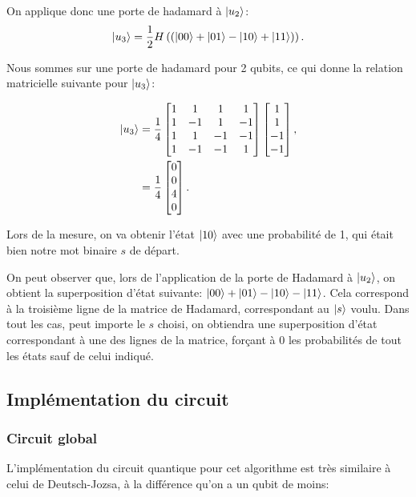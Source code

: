 On applique donc une porte de hadamard à $\ket{u_2}$:
\begin{equation}
  \label{eq:5}
\ket{u_3} = \frac{1}{2} H \left( (\ket{00} + \ket{01} - \ket{10} + \ket{11}) \right) .
\end{equation}

Nous sommes sur une porte de hadamard pour 2 qubits, ce qui donne
la relation matricielle suivante pour $\ket{u_3}$:

\begin{align}
\ket{u_3} &=
\frac{1}{4} 
\begin{bmatrix}
  1 & 1 & 1 & 1 \\
  1 & -1 & 1 & -1 \\
  1 & 1 & -1 & -1 \\
  1 & -1 & -1 & 1 \\
\end{bmatrix}
\begin{bmatrix}
  1 \\ 1 \\ -1 \\ -1
\end{bmatrix} \nonumber , \\ 
 &= \frac{1}{4} 
\begin{bmatrix}
  0 \\
  0 \\
  4 \\
  0 \\
\end{bmatrix}.
\end{align}

Lors de la mesure, on va obtenir l'état $\ket{10}$ avec une probabilité de 1, qui était bien notre mot binaire $s$ de départ.

On peut observer que, lors de l'application de la porte de Hadamard à $\ket{u_2}$, on obtient la superposition d'état suivante: $\ket{00} + \ket{01} - \ket{10} - \ket{11}$. Cela correspond à la troisième ligne de la matrice de Hadamard, correspondant au $\ket{s}$ voulu. Dans tout les cas, peut importe le $s$ choisi, on obtiendra une superposition d'état correspondant à une des lignes de la matrice, forçant à 0 les probabilités de tout les états sauf de celui indiqué.

\subsection{Implémentation du circuit}

\subsubsection*{Circuit global}
L'implémentation du circuit quantique pour cet algorithme est très similaire à celui de Deutsch-Jozsa, à la différence qu'on a un qubit de moins:

